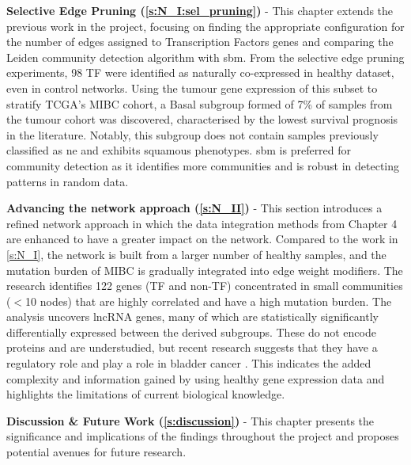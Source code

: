 \textbf{Selective Edge Pruning (\cref{s:N_I:sel_pruning})} - This chapter extends the previous work in the project, focusing on finding the appropriate configuration for the number of edges assigned to Transcription Factors genes and comparing the Leiden community detection algorithm with \acrfull{sbm}. From the selective edge pruning experiments, 98 TF were identified as naturally co-expressed in healthy dataset, even in control networks. Using the tumour gene expression of this subset to stratify TCGA's MIBC cohort, a Basal subgroup formed of 7\% of samples from the tumour cohort was discovered, characterised by the lowest survival prognosis in the literature. Notably, this subgroup does not contain samples previously classified as \acrlong{ne} and exhibits squamous phenotypes. \acrshort{sbm} is preferred for community detection as it identifies more communities and is robust in detecting patterns in random data.

\textbf{Advancing the network approach (\cref{s:N_II})} - This section introduces a refined network approach in which the data integration methods from Chapter 4 are enhanced to have a greater impact on the network. Compared to the work in \cref{s:N_I}, the network is built from a larger number of healthy samples, and the mutation burden of MIBC is gradually integrated into edge weight modifiers. The research identifies 122 genes (TF and non-TF) concentrated in small communities (\(<\)10 nodes) that are highly correlated and have a high mutation burden. The analysis uncovers \acrlong{lncRNA} genes, many of which are statistically significantly differentially expressed between the derived subgroups. These do not encode proteins and are understudied, but recent research suggests that they have a regulatory role \citep{Statello2021-md} and play a role in bladder cancer \citep{Zhan2018-um,Logotheti2020-ya}. This indicates the added complexity and information gained by using healthy gene expression data and highlights the limitations of current biological knowledge.

\textbf{Discussion \& Future Work (\cref{s:discussion})} - This chapter presents the significance and implications of the findings throughout the project and proposes potential avenues for future research.



